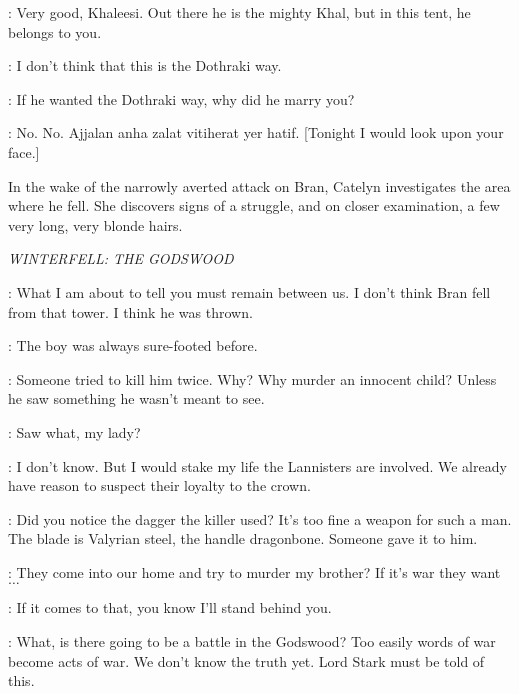 
\DOREAH: Very good, Khaleesi. Out there he is the mighty Khal, but in this tent, he belongs to you. 

\DAENERYS: I don't think that this is the Dothraki way. 

\DOREAH: If he wanted the Dothraki way, why did he marry you? 


\DAENERYS: No. No. Ajjalan anha zalat vitiherat yer hatif. [Tonight I would look upon your face.] 



\scene

\n In the wake of the narrowly averted attack on Bran, Catelyn investigates the area where he fell. She discovers signs of a struggle, and on closer examination, a few very long, very blonde hairs.


\scene

\textit{WINTERFELL: THE GODSWOOD}


\CATELYN: What I am about to tell you must remain between us. I don't think Bran fell from that tower. I think he was thrown. 

\LUWIN: The boy was always sure-footed before. 

\CATELYN: Someone tried to kill him twice. Why? Why murder an innocent child? Unless he saw something he wasn't meant to see. 

\THEON: Saw what, my lady? 

\CATELYN: I don't know. But I would stake my life the Lannisters are involved. We already have reason to suspect their loyalty to the crown. 

\RODRIK: Did you notice the dagger the killer used? It's too fine a weapon for such a man. The blade is Valyrian steel, the handle dragonbone. Someone gave it to him. 

\ROBB: They come into our home and try to murder my brother? If it's war they want $\ldots$ 

\THEON: If it comes to that, you know I'll stand behind you. 

\LUWIN: What, is there going to be a battle in the Godswood? Too easily words of war become acts of war. We don't know the truth yet. Lord Stark must be told of this. 

